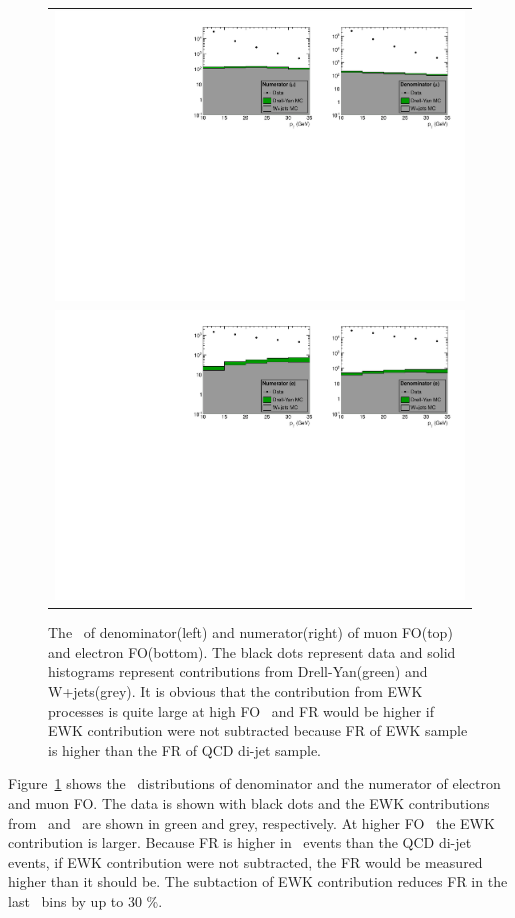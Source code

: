 \begin{figure}[htp] 
\centering 
\begin{tabular}{c} 
\includegraphics[width=1.00\textwidth]{figures/Num_den_pt_Mu.pdf}  \\
\includegraphics[width=1.00\textwidth]{figures/Num_den_pt_Ele.pdf}
\end{tabular} 
\caption{The \pt\ of denominator(left) and numerator(right) of 
muon FO(top) and electron FO(bottom). The black dots represent 
data and solid histograms represent contributions from Drell-Yan(green) 
and W+jets(grey). It is obvious 
that the contribution from EWK processes is quite large at high FO \pt\ 
and FR would be higher if EWK contribution were not subtracted
because FR of EWK sample is higher than the FR of QCD di-jet sample.  }
\label{fig:Num_Den_pt_EWK} 
\end{figure} 
Figure~\ref{fig:Num_Den_pt_EWK} shows the \pt\ distributions of denominator and the 
numerator of electron and muon FO. The data is shown with black dots and 
the EWK contributions from \dyll\ and \Wjets\ are shown in green 
and grey, respectively. At higher FO \pt\ the EWK contribution 
is larger. Because FR is higher in \Wjets\ events than the QCD di-jet 
events, if EWK contribution were not subtracted, the FR would be 
measured higher than it should be. The subtaction of EWK contribution 
reduces FR in the last \pt\ bins by up to 30 \%.

